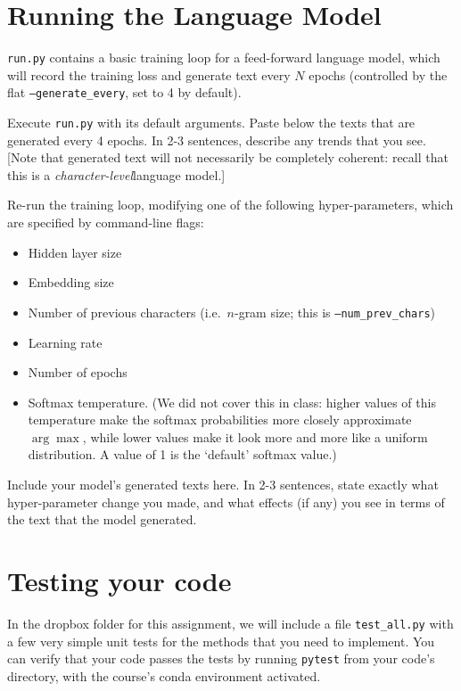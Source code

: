 \documentclass[11pt]{article}
\begin{document}
\section{Running the Language Model}

\texttt{run.py} contains a basic training loop for a feed-forward language model, which will record the training loss and generate text every $N$ epochs (controlled by the flat \texttt{--generate\_every}, set to 4 by default).

\vspace{2em}
  Execute \texttt{run.py} with its default arguments.  Paste below the texts that are generated every 4 epochs.  In 2-3 sentences, describe any trends that you see.  [Note that generated text will not necessarily be completely coherent: recall that this is a \emph{character-level}language model.]

\vspace{2em}
 Re-run the training loop, modifying one of the following hyper-parameters, which are specified by command-line flags:
\begin{itemize}
  \item Hidden layer size
  \item Embedding size
  \item Number of previous characters (i.e.\ $n$-gram size; this is \texttt{--num\_prev\_chars})
  \item Learning rate
  \item Number of epochs
  \item Softmax temperature.  (We did not cover this in class: higher values of this temperature make the softmax probabilities more closely approximate $\arg\max$, while lower values make it look more and more like a uniform distribution.  A value of 1 is the `default' softmax value.)
\end{itemize}
Include your model's generated texts here.  In 2-3 sentences, state exactly what hyper-parameter change you made, and what effects (if any) you see in terms of the text that the model generated.

\section{Testing your code}

In the dropbox folder for this assignment, we will include a file \texttt{test\_all.py} with a few very simple unit tests for the methods that you need to implement.  You can verify that your code passes the tests by running \texttt{pytest} from your code's directory, with the course's conda environment activated.
\end{document}
